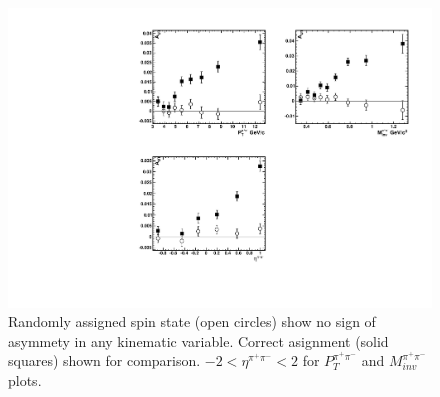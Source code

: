 \documentclass[letterpaper, abstract = on,listof=totoc, bibliography=totoc]{scrreprt}
\newcommand{\phirs}{\phi_{RS}}
\newcommand{\ptpair}{P_{T}^{\pi^+\pi^-}}
\newcommand{\mpair}{M_{inv}^{\pi^+\pi^-}}
\newcommand{\etapair}{\eta^{\pi^+\pi^-}}
\newcommand{\pip}{\pi^+}
\newcommand{\pim}{\pi^-}
\newcommand{\pair}{$\pip\pim$ }
\begin{document}

\begin{figure}
\begin{center}
\includegraphics[width = 1\textwidth]{randomSpin}
\caption[Asymmetry in \pair pairs when proton spin is randomly assigned]{Randomly assigned spin state (open circles) show no sign of asymmety in any kinematic variable. Correct asignment (solid squares) shown for comparison. $-2<\etapair<2$ for $\ptpair$ and $\mpair$ plots.}
\label{fig:randomSpin}
\end{center}
\end{figure}
\end{document}
